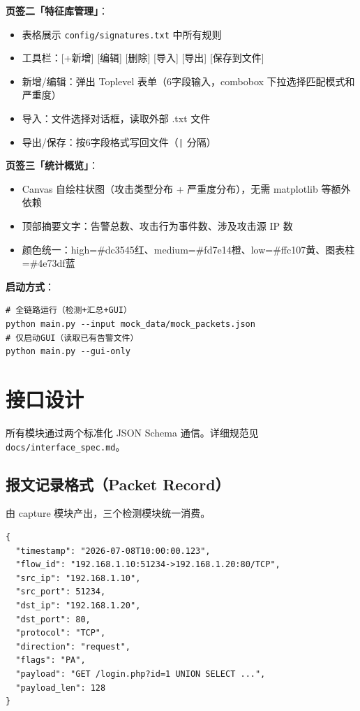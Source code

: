 \documentclass[12pt,a4paper]{ctexart}
\begin{document}
\textbf{页签二「特征库管理」}：
\begin{itemize}[nosep]
    \item 表格展示 \texttt{config/signatures.txt} 中所有规则
    \item 工具栏：[+新增] [编辑] [删除] [导入] [导出] [保存到文件]
    \item 新增/编辑：弹出 Toplevel 表单（6字段输入，combobox 下拉选择匹配模式和严重度）
    \item 导入：文件选择对话框，读取外部 .txt 文件
    \item 导出/保存：按6字段格式写回文件（\texttt{|} 分隔）
\end{itemize}

\textbf{页签三「统计概览」}：
\begin{itemize}[nosep]
    \item Canvas 自绘柱状图（攻击类型分布 + 严重度分布），无需 matplotlib 等额外依赖
    \item 顶部摘要文字：告警总数、攻击行为事件数、涉及攻击源 IP 数
    \item 颜色统一：high=\#dc3545红、medium=\#fd7e14橙、low=\#ffc107黄、图表柱=\#4e73df蓝
\end{itemize}

\textbf{启动方式}：
\begin{lstlisting}
# 全链路运行（检测+汇总+GUI）
python main.py --input mock_data/mock_packets.json
# 仅启动GUI（读取已有告警文件）
python main.py --gui-only
\end{lstlisting}

\section{接口设计}

所有模块通过两个标准化 JSON Schema 通信。详细规范见 \texttt{docs/interface\_spec.md}。

\subsection{报文记录格式（Packet Record）}

由 capture 模块产出，三个检测模块统一消费。

\begin{lstlisting}
{
  "timestamp": "2026-07-08T10:00:00.123",
  "flow_id": "192.168.1.10:51234->192.168.1.20:80/TCP",
  "src_ip": "192.168.1.10",
  "src_port": 51234,
  "dst_ip": "192.168.1.20",
  "dst_port": 80,
  "protocol": "TCP",
  "direction": "request",
  "flags": "PA",
  "payload": "GET /login.php?id=1 UNION SELECT ...",
  "payload_len": 128
}
\end{lstlisting}
\end{document}
